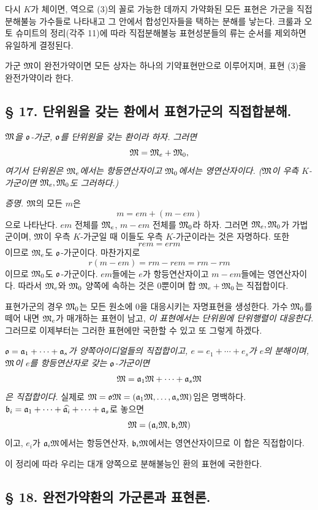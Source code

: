다시 \(K\)가 체이면, 역으로 (3)의 꼴로 가능한 데까지 가약화된 모든 표현은 가군을 직접분해불능 가수들로 나타내고 그 안에서 합성인자들을 택하는 분해를 낳는다. 크룰과 오토 슈미트의 정리(각주 11)에 따라 직접분해불능 표현성분들의 류는 순서를 제외하면 유일하게 결정된다.

가군 \(\mathfrak M\)이 완전가약이면 모든 상자는 하나의 기약표현만으로 이루어지며, 표현 (3)을 완전가약이라 한다.

\subsection*{§ 17. 단위원을 갖는 환에서 표현가군의 직접합분해.}

\emph{\(\mathfrak M\)을 \(\mathfrak o\)-가군, \(\mathfrak o\)를 단위원을 갖는 환이라 하자. 그러면}
\[
        \mathfrak M=\mathfrak M_e+\mathfrak M_0,
\]
\emph{여기서 단위원은 \(\mathfrak M_e\)에서는 항등연산자이고 \(\mathfrak M_0\)에서는 영연산자이다. (\(\mathfrak M\)이 우측 \(K\)-가군이면 \(\mathfrak M_e,\mathfrak M_0\)도 그러하다.)}

\emph{증명.} \(\mathfrak M\)의 모든 \(m\)은
\[
        m=em+(m-em)
\]
으로 나타난다. \(em\) 전체를 \(\mathfrak M_e\), \(m-em\) 전체를 \(\mathfrak M_0\)라 하자. 그러면 \(\mathfrak M_e,\mathfrak M_0\)가 가법군이며, \(\mathfrak M\)이 우측 \(K\)-가군일 때 이들도 우측 \(K\)-가군이라는 것은 자명하다. 또한
\[
        r em=erm
\]
이므로 \(\mathfrak M_e\)도 \(\mathfrak o\)-가군이다. 마찬가지로
\[
        r(m-em)=rm-rem=rm-rm
\]
이므로 \(\mathfrak M_0\)도 \(\mathfrak o\)-가군이다. \(em\)들에는 \(e\)가 항등연산자이고 \(m-em\)들에는 영연산자이다. 따라서 \(\mathfrak M_e\)와 \(\mathfrak M_0\) 양쪽에 속하는 것은 0뿐이며 합 \(\mathfrak M_e+\mathfrak M_0\)는 직접합이다.

표현가군의 경우 \(\mathfrak M_0\)는 모든 원소에 0을 대응시키는 자명표현을 생성한다. 가수 \(\mathfrak M_0\)를 떼어 내면 \(\mathfrak M_e\)가 매개하는 표현이 남고, \emph{이 표현에서는 단위원에 단위행렬이 대응한다.} 그러므로 이제부터는 그러한 표현에만 국한할 수 있고 또 그렇게 하겠다.

\emph{\(\mathfrak o=\mathfrak{a}_1+\cdots+\mathfrak{a}_s\)가 양쪽아이디얼들의 직접합이고, \(e=e_1+\cdots+e_s\)가 \(e\)의 분해이며, \(\mathfrak M\)이 \(e\)를 항등연산자로 갖는 \(\mathfrak o\)-가군이면}
\[
        \mathfrak M=\mathfrak{a}_1\mathfrak M+\cdots+\mathfrak{a}_s\mathfrak M
\]
\emph{은 직접합이다.} 실제로 \(\mathfrak M=\mathfrak o\mathfrak M=(\mathfrak{a}_1\mathfrak M,\ldots,\mathfrak{a}_s\mathfrak M)\)임은 명백하다. \(\mathfrak{b}_i=\mathfrak{a}_1+\cdots+\widehat{\mathfrak{a}_i}+\cdots+\mathfrak{a}_s\)로 놓으면
\[
        \mathfrak M=(\mathfrak{a}_i\mathfrak M,\mathfrak{b}_i\mathfrak M)
\]
이고, \(e_i\)가 \(\mathfrak{a}_i\mathfrak M\)에서는 항등연산자, \(\mathfrak{b}_i\mathfrak M\)에서는 영연산자이므로 이 합은 직접합이다.

이 정리에 따라 우리는 대개 양쪽으로 분해불능인 환의 표현에 국한한다.

\subsection*{§ 18. 완전가약환의 가군론과 표현론.}


